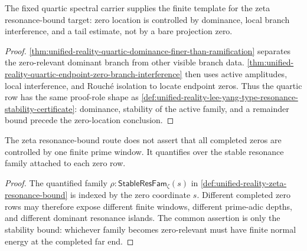 \begin{corollary}
\label{cor:unified-reality-quartic-carrier-finite-stability-template}
The fixed quartic spectral carrier supplies the finite template for the
zeta resonance-bound target: zero location is controlled by dominance,
local branch interference, and a tail estimate, not by a bare projection
zero.
\end{corollary}

\begin{proof}
\autoref{thm:unified-reality-quartic-dominance-finer-than-ramification}
separates the zero-relevant dominant branch from other visible branch
data.
\autoref{thm:unified-reality-quartic-endpoint-zero-branch-interference}
then uses active amplitudes, local interference, and Rouch\'e isolation
to locate endpoint zeros.  Thus the quartic row has the same proof-role
shape as
\autoref{def:unified-reality-lee-yang-type-resonance-stability-certificate}:
dominance, stability of the active family, and a remainder bound precede
the zero-location conclusion.
\end{proof}

\begin{corollary}
\label{cor:unified-reality-bound-target-avoids-fixed-window-assumption}
The zeta resonance-bound route does not assert that all completed zeros
are controlled by one finite prime window.  It quantifies over the
stable resonance family attached to each zero row.
\end{corollary}

\begin{proof}
The quantified family $\rho:\mathsf{StableResFam}_{\zeta}(s)$ in
\autoref{def:unified-reality-zeta-resonance-bound} is indexed by the
zero coordinate $s$.  Different completed zero rows may therefore expose
different finite windows, different prime-adic depths, and different
dominant resonance islands.  The common assertion is only the stability
bound: whichever family becomes zero-relevant must have finite normal
energy at the completed far end.
\end{proof}
